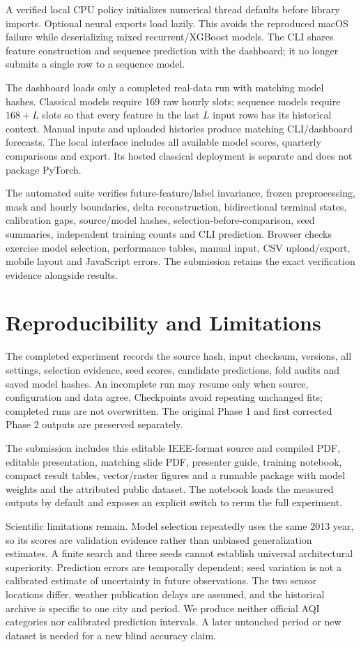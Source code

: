 \documentclass[conference]{IEEEtran}
\begin{document}
A verified local CPU policy initializes numerical thread defaults before library imports. Optional neural exports load lazily. This avoids the reproduced macOS failure while deserializing mixed recurrent/XGBoost models. The CLI shares feature construction and sequence prediction with the dashboard; it no longer submits a single row to a sequence model.

The dashboard loads only a completed real-data run with matching model hashes. Classical models require 169 raw hourly slots; sequence models require $168+L$ slots so that every feature in the last $L$ input rows has its historical context. Manual inputs and uploaded histories produce matching CLI/dashboard forecasts. The local interface includes all available model scores, quarterly comparisons and export. Its hosted classical deployment is separate and does not package PyTorch.

The automated suite verifies future-feature/label invariance, frozen preprocessing, mask and hourly boundaries, delta reconstruction, bidirectional terminal states, calibration gaps, source/model hashes, selection-before-comparison, seed summaries, independent training counts and CLI prediction. Browser checks exercise model selection, performance tables, manual input, CSV upload/export, mobile layout and JavaScript errors. The submission retains the exact verification evidence alongside results.

\section{Reproducibility and Limitations}
The completed experiment records the source hash, input checksum, versions, all settings, selection evidence, seed scores, candidate predictions, fold audits and saved model hashes. An incomplete run may resume only when source, configuration and data agree. Checkpoints avoid repeating unchanged fits; completed runs are not overwritten. The original Phase 1 and first corrected Phase 2 outputs are preserved separately.

The submission includes this editable IEEE-format source and compiled PDF, editable presentation, matching slide PDF, presenter guide, training notebook, compact result tables, vector/raster figures and a runnable package with model weights and the attributed public dataset. The notebook loads the measured outputs by default and exposes an explicit switch to rerun the full experiment.

Scientific limitations remain. Model selection repeatedly uses the same 2013 year, so its scores are validation evidence rather than unbiased generalization estimates. A finite search and three seeds cannot establish universal architectural superiority. Prediction errors are temporally dependent; seed variation is not a calibrated estimate of uncertainty in future observations. The two sensor locations differ, weather publication delays are assumed, and the historical archive is specific to one city and period. We produce neither official AQI categories nor calibrated prediction intervals. A later untouched period or new dataset is needed for a new blind accuracy claim.
\end{document}
